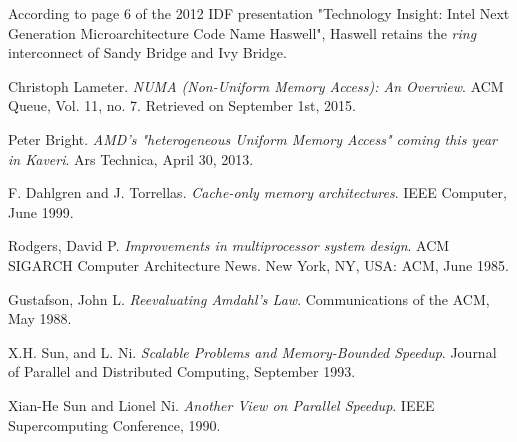 \documentclass[12pt]{article}
\numberwithin{equation}{section}
\numberwithin{table}{section}
\numberwithin{figure}{section}
\begin{document}
According to page 6 of the 2012 IDF presentation "Technology Insight: Intel Next Generation Microarchitecture Code Name Haswell", Haswell retains the \textit{ring} interconnect of Sandy Bridge and Ivy Bridge.
\begin{thebibliography}{9}
	Christoph Lameter. 
	\textit{NUMA (Non-Uniform Memory Access): An Overview}. ACM Queue, Vol. 11, no. 7. Retrieved on September 1st, 2015.
	
	Peter Bright. 
	\textit{AMD's "heterogeneous Uniform Memory Access" coming this year in Kaveri}. Ars Technica, April 30, 2013.
	
	F. Dahlgren and J. Torrellas. 
	\textit{Cache-only memory architectures}. IEEE Computer, June 1999.
	
	Rodgers, David P. 
	\textit{Improvements in multiprocessor system design}. ACM SIGARCH Computer Architecture News. New York, NY, USA: ACM, June 1985.
	
	Gustafson, John L.  
	\textit{Reevaluating Amdahl's Law}. Communications of the ACM, May 1988.
	
	X.H. Sun, and L. Ni.	  
	\textit{Scalable Problems and Memory-Bounded Speedup}. Journal of Parallel and Distributed Computing, September 1993.
	
	Xian-He Sun and Lionel Ni.	  
	\textit{Another View on Parallel Speedup}. IEEE Supercomputing Conference, 1990.

\end{thebibliography}
\end{document}
